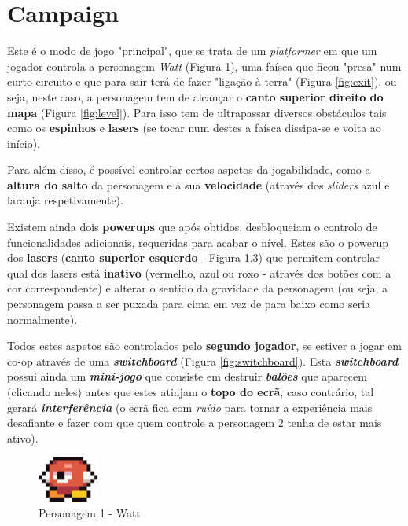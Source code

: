 \documentclass{report}
\begin{document}
\pagebreak

\section{Campaign}

Este é o modo de jogo "principal", que se trata de um \textit{platformer} em que um jogador controla a personagem \textit{Watt} (Figura \ref{fig:watt}), uma faísca que ficou "presa" num curto-circuito e que para sair terá de fazer "ligação à terra" (Figura \ref{fig:exit}), ou seja, neste caso, a personagem tem de alcançar o \textbf{canto superior direito do mapa} (Figura \ref{fig:level}\footnotemark). Para isso tem de ultrapassar diversos obstáculos tais como os \textbf{espinhos} e \textbf{lasers} (se tocar num destes a faísca dissipa-se e volta ao início).

Para além disso, é possível controlar certos aspetos da jogabilidade, como a \textbf{altura do salto} da personagem e a sua \textbf{velocidade} (através dos \textit{sliders} azul e laranja respetivamente). 

Existem ainda dois \textbf{powerups} que após obtidos, desbloqueiam o controlo de funcionalidades adicionais, requeridas para acabar o nível. Estes são o powerup dos \textbf{lasers} (\textbf{canto superior esquerdo} - Figura 1.3) que permitem controlar qual dos lasers está \textbf{inativo} (vermelho, azul ou roxo - através dos botões com a cor correspondente) e alterar o sentido da gravidade da personagem (ou seja, a personagem passa a ser puxada para cima em vez de para baixo como seria normalmente). 

Todos estes aspetos são controlados pelo \textbf{segundo jogador}, se estiver a jogar em co-op através de uma \textbf{\textit{switchboard}} (Figura \ref{fig:switchboard}). Esta \textbf{\textit{switchboard}} possui ainda um \textbf{\textit{mini-jogo}} que consiste em destruir \textbf{\textit{balões}} que aparecem (clicando neles) antes que estes atinjam o \textbf{topo do ecrã}, caso contrário, tal gerará \textbf{\textit{interferência}} (o ecrã fica com \textit{ruído} para tornar a experiência mais desafiante e fazer com que quem controle a personagem 2 tenha de estar mais ativo).

\begin{figure}[H]
	\centering
	\includegraphics{watt}
	\caption{Personagem 1 - Watt}
	\label{fig:watt}
\end{figure}
\end{document}
